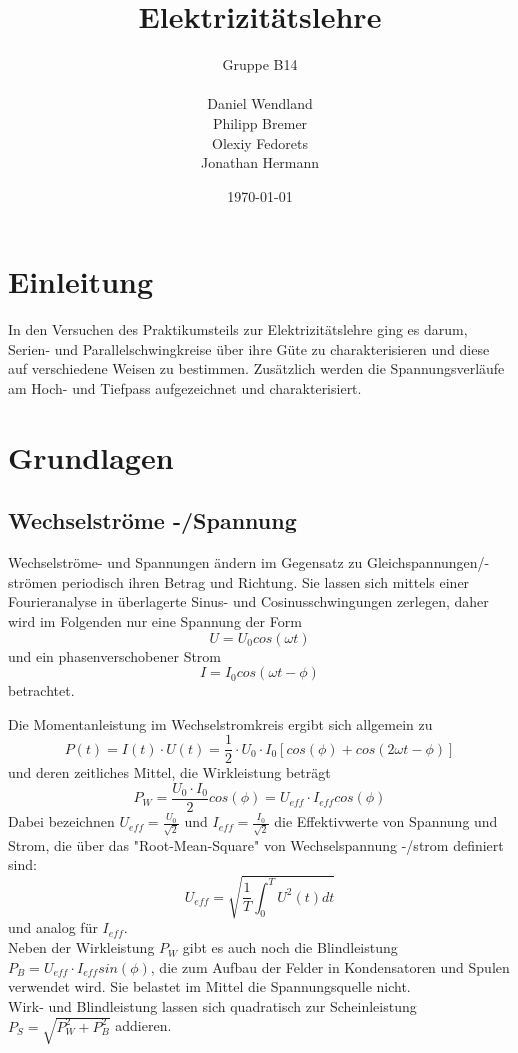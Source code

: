 \documentclass[a4paper, 11pt]{article}
\begin{document}
\title{Elektrizitätslehre}
\author{Gruppe B14 \\ \\ Daniel Wendland \\ Philipp Bremer \\ Olexiy Fedorets \\ Jonathan Hermann}
\date{\today}
\maketitle

\newpage

\tableofcontents
\newpage


\section{Einleitung}
In den Versuchen des Praktikumsteils zur Elektrizitätslehre ging es darum, Serien- und Parallelschwingkreise über ihre Güte zu charakterisieren und diese auf verschiedene Weisen zu bestimmen. Zusätzlich werden die Spannungsverläufe am Hoch- und Tiefpass aufgezeichnet und charakterisiert.

\section{Grundlagen}
\subsection{Wechselströme -/Spannung}
Wechselströme- und Spannungen ändern im Gegensatz zu Gleichspannungen/-strömen periodisch ihren Betrag und Richtung. Sie lassen sich mittels einer Fourieranalyse in überlagerte Sinus- und Cosinusschwingungen zerlegen, daher wird im Folgenden nur eine Spannung der Form 
\[ U = U_0 cos( \omega t) \] und ein phasenverschobener Strom \[ I = I_0 cos( \omega t - \phi) \] betrachtet. 

Die Momentanleistung im Wechselstromkreis ergibt sich allgemein zu \[ P(t) = I(t) \cdot U(t) = \frac{1}{2} \cdot U_0 \cdot I_0 [cos(\phi) + cos(2 \omega t - \phi)] \]
und deren zeitliches Mittel, die Wirkleistung beträgt \[P_W = \frac{U_0 \cdot I_0}{2} cos(\phi) = U_{eff} \cdot I_{eff} cos(\phi) \]
Dabei bezeichnen $U_{eff} = \frac{U_0}{\sqrt{2}}$ und $I_{eff} = \frac{I_0}{\sqrt{2}}$ die Effektivwerte von Spannung und Strom, die über das "Root-Mean-Square" von Wechselspannung -/strom definiert sind: \[U_{eff} = \sqrt{ \frac{1}{T} \int_0^T U^2(t) dt}\] und analog für $I_{eff}$. \\
Neben der Wirkleistung $P_W$ gibt es auch noch die Blindleistung $P_B = U_{eff} \cdot I_{eff} sin(\phi)$, die zum Aufbau der Felder in Kondensatoren und Spulen verwendet wird. Sie belastet im Mittel die Spannungsquelle nicht.\\
Wirk- und Blindleistung lassen sich quadratisch zur Scheinleistung $P_S = \sqrt{P_W^2 + P_B^2}$ addieren.
\end{document}
